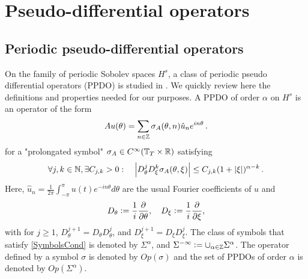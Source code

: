 \documentclass[a4paper]{article}
\begin{document}
\section{Pseudo-differential operators}

\subsection{Periodic pseudo-differential operators}

On the family of periodic Sobolev spaces $H^s$, a class of periodic pseudo differential operators (PPDO) is studied in \cite{thrunen1998symbol}. We quickly review here the definitions and properties needed for our purposes. A PPDO of order $\alpha$ on $H^s$ is an operator of the form 
\[Au(\theta) =  \sum_{n \in \mathbb{Z}} \sigma_A(\theta,n) \hat{u}_n e^{in\theta}\,.\]
for a "prolongated symbol" $\sigma_A \in C^{\infty}(\mathbb{T}_T \times \mathbb{R})$ satisfying 
\begin{equation}
\label{SymbolsCond}
	\forall j,k \in \mathbb{N}, \exists C_{j,k} >0 : \quad \left\lvert D^j_\theta D_\xi^k \sigma_A(\theta,\xi) \right\rvert \leq C_{j,k}(1 + \left\lvert \xi \right\rvert)^{\alpha - k}\,.
\end{equation}
Here, $\hat{u}_n = \frac{1}{2\pi}\int_{-\pi}^{\pi}u(t) e^{-in\theta}d\theta$ are the usual Fourier coefficients of $u$ and 
$${D_\theta \mathrel{\mathop:}= \frac{1}{i}\frac{\partial}{\partial \theta}}, \quad  D_\xi \mathrel{\mathop:}= \frac{1}{i}\frac{\partial}{\partial \xi},$$ 
with for $j \geq 1$, $D_\theta^{j+1} = D_\theta D_\theta^j$, and $D_\xi^{j+1} = D_\xi D_\xi^j$. 
The class of symbols that satisfy \eqref{SymbolsCond} is denoted by $\Sigma^\alpha$, and $\Sigma^{-\infty} \mathrel{\mathop:}= \cup_{\alpha \in \mathbb{Z}} \Sigma^\alpha$. The operator defined by a symbol $\sigma$ is denoted by $\textit{Op}(\sigma)$ and the set of PPDOs of order $\alpha$ is denoted by $\textit{Op}(\Sigma^\alpha)$. 
\end{document}
